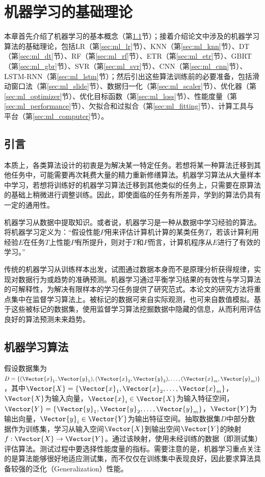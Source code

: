 \chapter{机器学习的基础理论}\label{chap:ml_theory}

本章首先介绍了机器学习的基本概念（第\ref{sec:ml_intro}节）；接着介绍论文中涉及的机器学习算法的基础理论，包括LR（第\ref{sec:ml_lr}节）、KNN（第\ref{sec:ml_knn}节）、DT（第\ref{sec:ml_dt}节）、RF（第\ref{sec:ml_rf}节）、ETR（第\ref{sec:ml_etr}节）、GBRT（第\ref{sec:ml_gbr}节）、SVR（第\ref{sec:ml_svr}节）、CNN（第\ref{sec:ml_cnn}节）、LSTM-RNN（第\ref{sec:ml_lstm}节）；然后引出这些算法训练前的必要准备，包括滑动窗口法（第\ref{sec:ml_slide}节）、数据归一化（第\ref{sec:ml_scaler}节）、优化器（第\ref{sec:ml_optimizer}节）、优化目标函数（第\ref{sec:ml_loss}节）、性能度量（第\ref{sec:ml_performance}节）、欠拟合和过拟合（第\ref{sec:ml_fitting}节）、计算工具与平台（第\ref{sec:ml_computer}节）。

\section{引言}\label{sec:ml_intro}

本质上，各类算法设计的初衷是为解决某一特定任务。若想将某一种算法迁移到其他任务中，可能需要再次耗费大量的精力重新修缮算法。机器学习算法从大量样本中学习，若想将训练好的机器学习算法迁移到其他类似的任务上，只需要在原算法的基础上稍微进行调整训练。因此，即使面临的任务有所差异，学到的算法仍具有一定的通用性\citep{Goodfellow2016Deep}。

机器学习从数据中提取知识。或者说，机器学习是一种从数据中学习经验的算法。\citet{Mitchell1997Machine}将机器学习定义为：“假设性能$P$用来评估计算机计算的某类任务$T$，若该计算利用经验$E$在任务$T$上性能$P$有所提升，则对于$T$和$P$而言，计算机程序从$E$进行了有效的学习。”

传统的机器学习从训练样本出发，试图通过数据本身而不是原理分析获得规律，实现对数据行为或趋势的准确预测。机器学习通过平衡学习结果的有效性与学习算法的可解释性，为解决有限样本的学习任务提供了研究范式。本论文的研究方法将重点集中在监督学习算法上。被标记的数据可来自实际观测，也可来自数值模拟。基于这些被标记的数据集，使用监督学习算法挖掘数据中隐藏的信息，从而利用评估良好的算法预测未来趋势。

\section{机器学习算法}\label{sec:ml}

假设数据集为$D=\{(\Vector{x}_1,\Vector{y}_1),(\Vector{x}_2,\Vector{y}_2),\ldots,(\Vector{x}_m,\Vector{y}_m)\}$，其中$\Vector{X}=\{\Vector{x}_1,\Vector{x}_2,\ldots,\Vector{x}_m\}$，$\Vector{X}$为输入向量，$\Vector{x}_i\in\Vector{X}$为输入特征空间，$\Vector{Y}=\{\Vector{y}_1,\Vector{y}_2,\ldots,\Vector{y}_m\}$，$\Vector{Y}$为输出向量，$\Vector{y}_i\in\Vector{Y}$为输出特征空间。抽取数据集$D$中部分数据作为训练集，学习从输入空间$\Vector{X}$到输出空间$\Vector{Y}$的映射$f:\Vector{X}\rightarrow\Vector{Y}$。通过该映射，使用未经训练的数据（即测试集）评估算法。测试过程中要选择性能度量的指标。需要注意的是，机器学习重点关注的是算法能够很好地适应测试集，而不仅仅在训练集中表现良好，因此要求算法具备较强的泛化（Generalization）性能。

